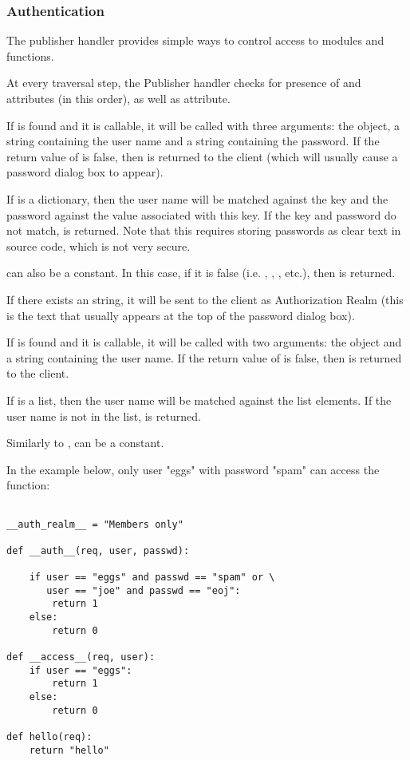 \subsubsection{Authentication\label{hand-pub-alg-auth}}

The publisher handler provides simple ways to control access to
modules and functions.

At every traversal step, the Publisher handler checks for presence of
 and  attributes (in this order), as 
well as  attribute. 

If  is found and it is callable, it will be called
with three arguments: the  object, a string containing
the user name and a string containing the password. If the return
value of
 is false, then  is
returned to the client (which will usually cause a password dialog box
to appear).

If  is a dictionary, then the user name will be
matched against the key and the password against the value associated
with this key. If the key and password do not match, 
 is returned. Note that this requires
storing passwords as clear text in source code, which is not very secure.

 can also be a constant. In this case, if it is false
(i.e. , , , etc.), then 
 is returned.

If there exists an  string, it will be sent
to the client as Authorization Realm (this is the text that usually
appears at the top of the password dialog box).

If  is found and it is callable, it will be called
with two arguments: the  object and a string containing
the user name. If the return value of  is false, then
 is returned to the client.

If  is a list, then the user name will be matched
against the list elements. If the user name is not in the list, 
 is returned.

Similarly to ,  can be a constant.

In the example below, only user "eggs" with password "spam" can access
the  function:

\begin{verbatim}

__auth_realm__ = "Members only"

def __auth__(req, user, passwd):

    if user == "eggs" and passwd == "spam" or \
       user == "joe" and passwd == "eoj":
        return 1
    else:
        return 0

def __access__(req, user):
    if user == "eggs":
        return 1
    else:
        return 0

def hello(req):
    return "hello"

\end{verbatim}

